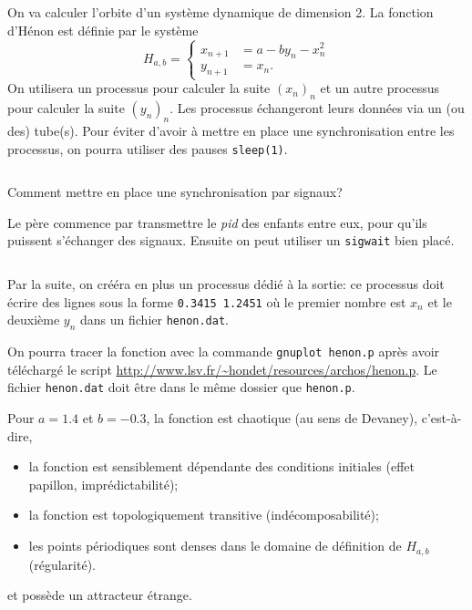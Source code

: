 \documentclass{exam}
\begin{document}
\begin{questions}
On va calculer l'orbite d'un système dynamique de dimension 2. La fonction
d'Hénon est définie par le système
\begin{equation}
  \label{eq:1}
  H_{a,b} = \left\{
    \begin{aligned}
      x_{n+1} &= a - by_{n} - x_{n}^{2} \\
      y_{n+1} &= x_{n}.
    \end{aligned}
    \right.
\end{equation}
On utilisera un processus pour calculer la suite \( (x_{n})_{n} \) et un autre
processus pour calculer la suite \( (y_{n})_{n} \). Les processus échangeront
leurs données via un (ou des) tube(s). Pour éviter d'avoir à mettre en place une
synchronisation entre les processus, on pourra utiliser des pauses
\verb|sleep(1)|.

\begin{solution}
  \inputminted{C}{henon/henon_simple.c}
\end{solution}

Comment mettre en place une synchronisation par signaux?
\begin{solution}
  Le père commence par transmettre le \textit{pid} des enfants entre eux, pour
  qu'ils puissent s'échanger des signaux. Ensuite on peut utiliser un
  \verb|sigwait| bien placé.
  \inputminted{C}{henon/henon_sync_signal.c}
\end{solution}

Par la suite, on crééra en plus un processus dédié à la sortie: ce processus
doit écrire des lignes sous la forme \texttt{0.3415 1.2451} où le premier nombre
est $x_{n}$ et le deuxième $y_{n}$ dans un fichier \texttt{henon.dat}.

On pourra tracer la fonction avec la commande \texttt{gnuplot henon.p} après
avoir téléchargé le script
\url{http://www.lsv.fr/~hondet/resources/archos/henon.p}. Le fichier
\texttt{henon.dat} doit être dans le même dossier que \texttt{henon.p}.

Pour \( a = 1.4 \) et \( b = -0.3 \), la fonction est chaotique (au sens de
Devaney), c'est-à-dire,
\begin{itemize}
  \item la fonction est sensiblement dépendante des conditions initiales (effet
    papillon, imprédictabilité);
  \item la fonction est topologiquement transitive (indécomposabilité);
  \item les points périodiques sont denses dans le domaine de définition de
    $H_{a, b}$ (régularité).
\end{itemize}
et possède un attracteur étrange.


\end{questions}
\end{document}
